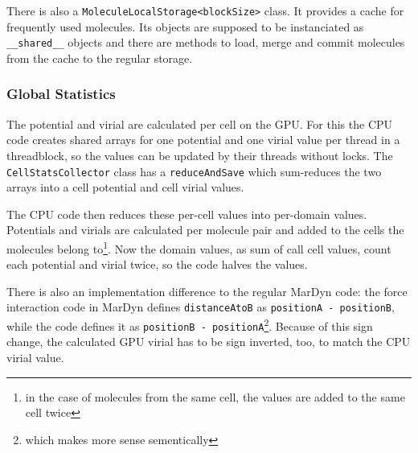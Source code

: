 There is also a \lstinline!MoleculeLocalStorage<blockSize>! class. It provides a cache for frequently used molecules. Its objects are supposed to be instanciated as \lstinline!__shared__! objects and there are methods to load, merge and commit molecules from the cache to the regular storage.

\subsubsection{Global Statistics}
The potential and virial are calculated per cell on the GPU. For this the CPU code creates shared arrays for one potential and one virial value per thread in a threadblock, so the values can be updated by their threads without locks. The \lstinline!CellStatsCollector! class has a \lstinline!reduceAndSave! which sum-reduces the two arrays into a cell potential and cell virial values.

The CPU code then reduces these per-cell values into per-domain values. Potentials and virials are calculated per molecule pair and added to the cells the molecules belong to\footnote{in the case of molecules from the same cell, the values are added to the same cell twice}. Now the domain values, as sum of call cell values, count each potential and virial twice, so the code halves the values.

There is also an implementation difference to the regular MarDyn code: the force interaction code in MarDyn defines \lstinline!distanceAtoB! as \lstinline!positionA - positionB!, while the \cuda{} code defines it as \lstinline!positionB - positionA!\footnote{which makes more sense sementically}. Because of this sign change, the calculated GPU virial has to be sign inverted, too, to match the CPU virial value.


